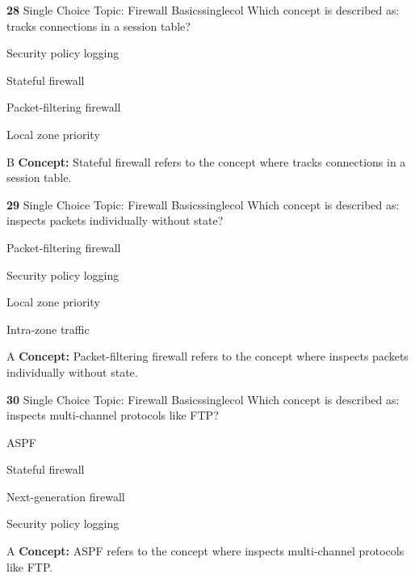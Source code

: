 \documentclass[10pt,a4paper]{article}
\begin{document}
\begin{qcard}{\color{white}\textbf{28} \hfill \small Single Choice \textbar{} Topic: Firewall Basics}{singlecol}
Which concept is described as: tracks connections in a session table?

\begin{qoptions}
\item Security policy logging
\item Stateful firewall
\item Packet-filtering firewall
\item Local zone priority
\end{qoptions}
\begin{explainbox}{B}
\textbf{Concept:} Stateful firewall refers to the concept where tracks connections in a session table.
\end{explainbox}
\end{qcard}

\begin{qcard}{\color{white}\textbf{29} \hfill \small Single Choice \textbar{} Topic: Firewall Basics}{singlecol}
Which concept is described as: inspects packets individually without state?

\begin{qoptions}
\item Packet-filtering firewall
\item Security policy logging
\item Local zone priority
\item Intra-zone traffic
\end{qoptions}
\begin{explainbox}{A}
\textbf{Concept:} Packet-filtering firewall refers to the concept where inspects packets individually without state.
\end{explainbox}
\end{qcard}

\begin{qcard}{\color{white}\textbf{30} \hfill \small Single Choice \textbar{} Topic: Firewall Basics}{singlecol}
Which concept is described as: inspects multi-channel protocols like FTP?

\begin{qoptions}
\item ASPF
\item Stateful firewall
\item Next-generation firewall
\item Security policy logging
\end{qoptions}
\begin{explainbox}{A}
\textbf{Concept:} ASPF refers to the concept where inspects multi-channel protocols like FTP.
\end{explainbox}
\end{qcard}
\end{document}
